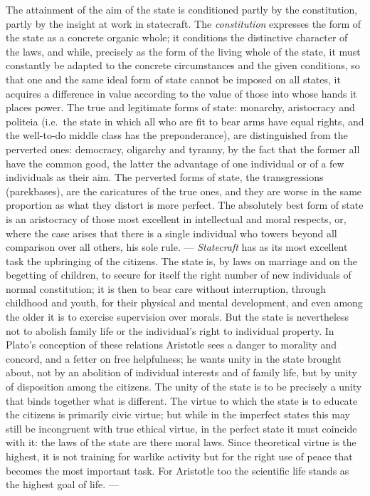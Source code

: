 The attainment of the aim of the state is conditioned partly by
the constitution, partly by the insight at work in statecraft. The \emph{constitution} expresses the form of the state as a concrete organic whole; it conditions the distinctive character of the laws, and while, precisely as the form of the living whole of the state,
it must constantly be adapted to the concrete circumstances and the given
conditions, so that one and the same ideal form of state cannot be
imposed on all states, it acquires a difference in value according to
the value of those into whose hands it places power. The true and
legitimate forms of state: monarchy, aristocracy and politeia
(i.e.\ the state in which all who are fit to bear arms have equal rights, and the well-to-do middle class has the preponderance), are distinguished from the perverted ones: democracy, oligarchy and tyranny, by the fact that the former all have the common good, the latter the
advantage of one individual or of a few individuals as their aim. The perverted
forms of state, the transgressions (parekbases), are the
caricatures of the true ones, and they are worse in the same proportion as what they
distort is more perfect. The absolutely best form of state is an
aristocracy of those most excellent in intellectual and moral respects, or, where the case arises that there is a single individual
who towers beyond all comparison over all others, his
sole rule. --- \emph{Statecraft} has as its most excellent
task the upbringing of the citizens. The state is, by laws on
marriage and on the begetting of children, to secure for itself the right
number of new individuals of normal constitution; it is then
to bear care without interruption, through childhood and youth, for their physical and mental development, and even
among the older it is to exercise supervision over morals. But
the state is nevertheless not to abolish family life or the individual's
right to individual property. In Plato's conception of these relations Aristotle sees a danger to morality and concord, and a fetter on free helpfulness; he wants
unity in the state brought about, not by an abolition of
individual interests and of family life, but by unity of
disposition among the citizens. The unity of the state is to be precisely a
unity that binds together what is different. The virtue to
which the state is to educate the citizens is primarily civic virtue;
but while in the imperfect states this may still be
incongruent with true ethical virtue, in the
perfect state it must coincide with it: the laws of the state are there
moral laws. Since theoretical virtue is the highest, it is
not training for warlike activity but for the right
use of peace that becomes the most important task. For Aristotle too the scientific life stands as the highest goal of life. ---

